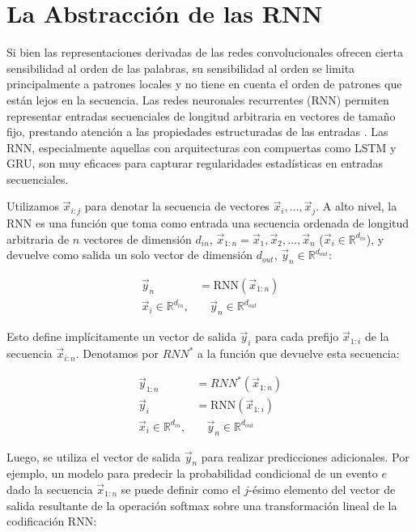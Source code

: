 \documentclass{book}
\begin{document}
\section{La Abstracción de las RNN}

Si bien las representaciones derivadas de las redes convolucionales ofrecen cierta sensibilidad al orden de las palabras, su sensibilidad al orden se limita principalmente a patrones locales y no tiene en cuenta el orden de patrones que están lejos en la secuencia. Las redes neuronales recurrentes (RNN) permiten representar entradas secuenciales de longitud arbitraria en vectores de tamaño fijo, prestando atención a las propiedades estructuradas de las entradas \cite{goldberg2016primer}. Las RNN, especialmente aquellas con arquitecturas con compuertas como LSTM y GRU, son muy eficaces para capturar regularidades estadísticas en entradas secuenciales.

Utilizamos $\vec{x}_{i:j}$ para denotar la secuencia de vectores $\vec{x}_i, \dots, \vec{x}_j$. A alto nivel, la RNN es una función que toma como entrada una secuencia ordenada de longitud arbitraria de $n$ vectores de dimensión $d_{in}$, $\vec{x}_{1 :n}=\vec{x}_1,\vec{x}_2, \dots, \vec{x}_n$ ($\vec{x}_i \in \mathbb{R}^{d_{in}}$), y devuelve como salida un solo vector de dimensión $d_{out}$, $\vec{y}_n \in \mathbb{R}^{d_{out}}$:

\begin{equation}
\begin{split}
\vec{y}_n & = \text{RNN}(\vec{x}_{1:n}) \\
\vec{x}_i \in \mathbb{R}^{d_{in}}, & \quad \vec{y}_n \in \mathbb{R}^{d_{out}}
\end{split}
\end{equation}

Esto define implícitamente un vector de salida $\vec{y}_i$ para cada prefijo $\vec{x}_{1:i}$ de la secuencia $\vec{x}_{i:n}$. Denotamos por $RNN^{*}$ a la función que devuelve esta secuencia:

\begin{equation}
\begin{split}
\vec{y}_{1:n} & = RNN^{*}(\vec{x}_{1:n}) \\
\vec{y}_i & = \text{RNN}(\vec{x}_{1:i}) \\
\vec{x}_i \in \mathbb{R}^{d_{in}}, & \quad \vec{y}_n \in \mathbb{R}^{d_{out}}
\end{split}
\end{equation}

Luego, se utiliza el vector de salida $\vec{y}_n$ para realizar predicciones adicionales. Por ejemplo, un modelo para predecir la probabilidad condicional de un evento $e$ dado la secuencia $\vec{x}_{1:n}$ se puede definir como el $j$-ésimo elemento del vector de salida resultante de la operación softmax sobre una transformación lineal de la codificación RNN:
\end{document}
